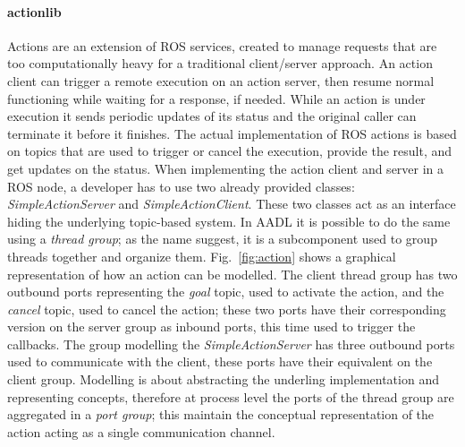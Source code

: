 \paragraph{actionlib} Actions are an extension of ROS services, created to manage requests that are too computationally heavy for a traditional client/server approach. An action client can trigger a remote execution on an action server, then resume normal functioning while waiting for a response, if needed. While an action is under execution it sends periodic updates of its status and the original caller can terminate it before it finishes. The actual implementation of ROS actions is based on topics that are used to trigger or cancel the execution, provide the result, and get updates on the status.
When implementing the action client and server in a ROS node, a developer has to use two already provided classes: \textit{SimpleActionServer} and \textit{SimpleActionClient}. These two classes act as an interface hiding the underlying topic-based system. In AADL it is possible to do the same using a \textit{thread group}; as the name suggest, it is a subcomponent used to group threads together and organize them. Fig.~\ref{fig:action} shows a graphical representation of how an action can be modelled. The client thread group has two outbound ports representing the \textit{goal} topic, used to activate the action, and the \textit{cancel} topic, used to cancel the action; these two ports have their corresponding version on the server group as inbound ports, this time used to trigger the callbacks. The group modelling the \textit{SimpleActionServer} has three outbound ports used to communicate with the client, these ports have their equivalent on the client group. Modelling is about abstracting the underling implementation and representing concepts, therefore at process level the ports of the thread group are aggregated in a \textit{port group}; this maintain the conceptual representation of the action acting as a single communication channel.

